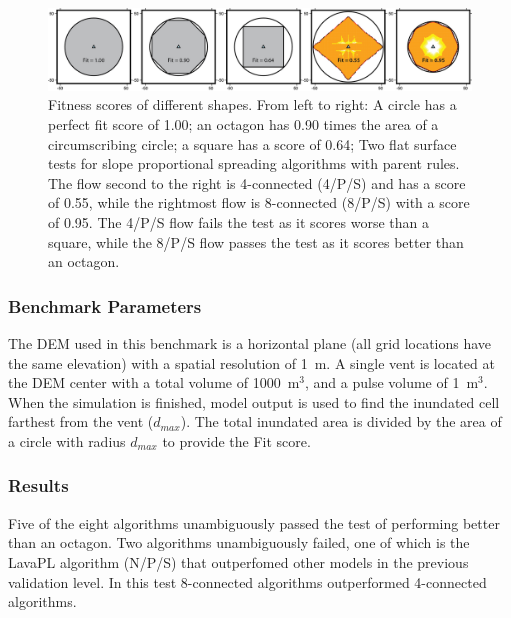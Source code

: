 \documentclass[12pt,letter]{article}
\begin{document}
		\begin{figure}[!h]
		\centering
		\includegraphics[width=\linewidth]{figures/pancake}
		\caption{Fitness scores of different shapes. From left to right: A circle has a perfect fit score of 1.00; an octagon has 0.90 times the area of a circumscribing circle; a square has a score of 0.64; Two flat surface tests for slope proportional spreading algorithms with parent rules. The flow second to the right is 4-connected (4/P/S) and has a score of 0.55, while the rightmost flow is 8-connected (8/P/S) with a score of 0.95. The 4/P/S flow fails the test as it scores worse than a square, while the 8/P/S flow passes the test as it scores better than an octagon.}
		\label{fig_pancake}
	\end{figure}
	
		\subsubsection{Benchmark Parameters} The DEM used in this benchmark is a horizontal plane (all grid locations have the same elevation) with a spatial resolution of 1~m. A single vent is located at the DEM center with a total volume of 1000~m$^3$, and a pulse volume of 1~m$^3$. When the simulation is finished, model output is used to find the inundated cell farthest from the vent ($d_{max}$). The total inundated area is divided by the area of a circle with radius $d_{max}$ to provide the Fit score.
		
		\subsubsection{Results}

		Five of the eight algorithms unambiguously passed the test of performing better than an octagon. Two algorithms unambiguously failed, one of which is the LavaPL algorithm (N/P/S) that outperfomed other models in the previous validation level. In this test 8-connected algorithms outperformed 4-connected algorithms.
		
\end{document}
